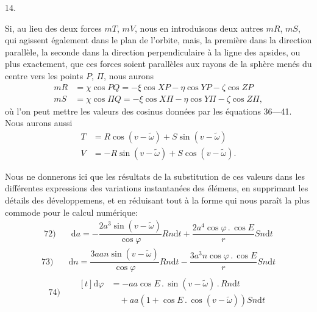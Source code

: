 \par{}\bigskip
{}
\begin{center}14.\end{center}
\noindent\hspace*{\parindent}Si, au lieu des deux forces \(mT\), \(mV\), nous en introduisons deux autres \(mR\), \(mS\), qui agissent également dans le plan de l’orbite, mais, la première dans la direction parallèle, la seconde dans la direction perpendiculaire à la ligne des apsides, ou plus exactement, que ces forces soient parallèles aux rayons de la sphère menés du centre vers les points \(P\), \(\Pi\), nous aurons
\[
\begin{aligned}
mR&=\chi\cos PQ=-\xi\cos XP-\eta\cos YP-\zeta\cos ZP\\
mS&=\chi\cos\Pi Q=-\xi\cos X\Pi-\eta\cos Y\Pi-\zeta\cos Z\Pi,
\end{aligned}
\]
où l’on peut mettre les valeurs des cosinus données par les équations 36—41. Nous aurons aussi
\[
\begin{aligned}
T&=R\cos(v-\tilde\omega)+S\sin(v-\tilde\omega)\\
V&=-R\sin(v-\tilde\omega)+S\cos(v-\tilde\omega).
\end{aligned}
\]
\par Nous ne donnerons ici que les résultats de la substitution de ces valeurs dans les différentes expressions des variations instantanées des élémens, en supprimant les détails des développemens, et en réduisant tout à la forme qui nous paraît la plus commode pour le calcul numérique:
\[
\begin{array}{rl}
72)\quad&\mathrm{d}a=-\dfrac{2a^3\sin(v-\tilde\omega)}{\cos\varphi}Rn\mathrm{d}t+\dfrac{2a^4\cos\varphi\mathbin{.}\cos E}{r}Sn\mathrm{d}t
\end{array}
\]
\[
\begin{array}{rl}
73)\quad&\mathrm{d}n=\dfrac{3aan\sin(v-\tilde\omega)}{\cos\varphi}Rn\mathrm{d}t-\dfrac{3a^3n\cos\varphi\mathbin{.}\cos E}{r}Sn\mathrm{d}t
\end{array}
\]
\[
\begin{array}{rl}
74)\quad&\begin{aligned}[t]\mathrm{d}\varphi&=-aa\cos E\mathbin{.}\sin(v-\tilde\omega)\mathbin{.}Rn\mathrm{d}t\\
&\quad+aa(1+\cos E\mathbin{.}\cos(v-\tilde\omega))Sn\mathrm{d}t\end{aligned}
\end{array}
\]
